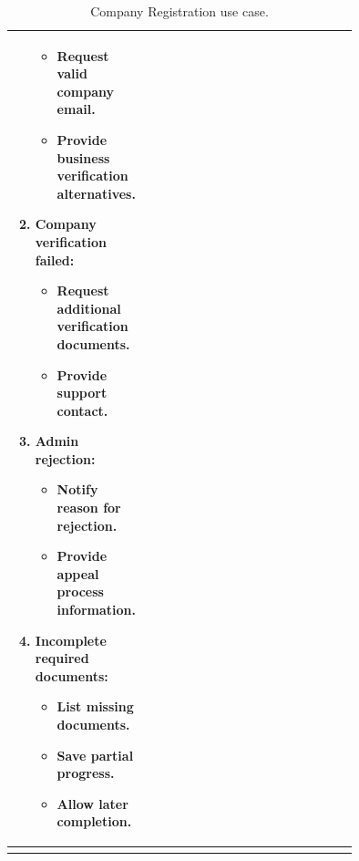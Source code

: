 \begin{center}
\begin{longtable}{|l|p{0.75\linewidth}|}
\begin{enumerate}
\begin{itemize}
                \item Request valid company email.
                \item Provide business verification alternatives.
            \end{itemize} 
            \item \textbf{Company verification failed:} \begin{itemize}
                \item Request additional verification documents.
                \item Provide support contact.
            \end{itemize} 
            \item \textbf{Admin rejection:} 
            \begin{itemize}
                \item Notify reason for rejection.
                \item Provide appeal process information.
            \end{itemize} 
            \item \textbf{Incomplete required documents:} \begin{itemize}
                \item List missing documents.
                \item Save partial progress.
                \item Allow later completion.
            \end{itemize}  
        \end{enumerate} \\
        \hline
        \caption{Company Registration use case.}
        \label{tab:company_registration_use_case}
    \end{longtable}
\end{center}


